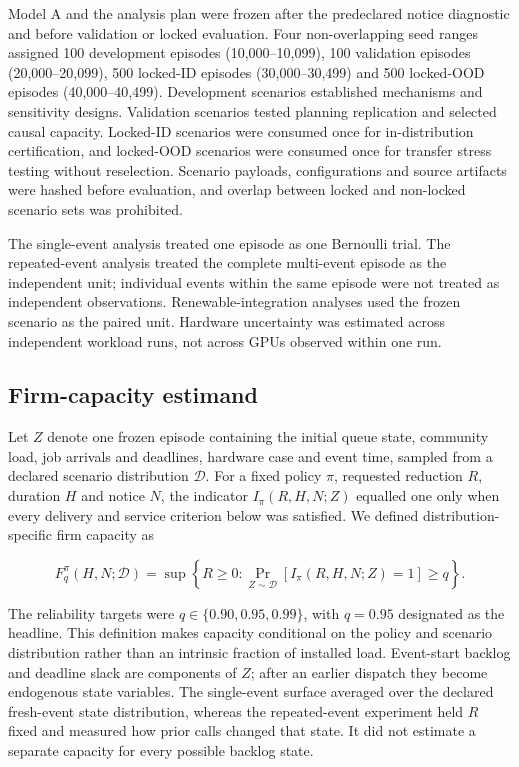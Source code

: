 \documentclass[10pt,a4paper]{article}
\begin{document}
Model A and the analysis plan were frozen after the predeclared notice diagnostic and before validation or locked evaluation. Four non-overlapping seed ranges assigned 100 development episodes (10,000–10,099), 100 validation episodes (20,000–20,099), 500 locked-ID episodes (30,000–30,499) and 500 locked-OOD episodes (40,000–40,499). Development scenarios established mechanisms and sensitivity designs. Validation scenarios tested planning replication and selected causal capacity. Locked-ID scenarios were consumed once for in-distribution certification, and locked-OOD scenarios were consumed once for transfer stress testing without reselection. Scenario payloads, configurations and source artifacts were hashed before evaluation, and overlap between locked and non-locked scenario sets was prohibited.


The single-event analysis treated one episode as one Bernoulli trial. The repeated-event analysis treated the complete multi-event episode as the independent unit; individual events within the same episode were not treated as independent observations. Renewable-integration analyses used the frozen scenario as the paired unit. Hardware uncertainty was estimated across independent workload runs, not across GPUs observed within one run.


\subsection*{Firm-capacity estimand}

Let \(Z\) denote one frozen episode containing the initial queue state, community load, job arrivals and deadlines, hardware case and event time, sampled from a declared scenario distribution \(\mathcal D\). For a fixed policy \(\pi\), requested reduction \(R\), duration \(H\) and notice \(N\), the indicator \(I_\pi(R,H,N;Z)\) equalled one only when every delivery and service criterion below was satisfied. We defined distribution-specific firm capacity as


\begin{equation*}
F_q^{\pi}(H,N;\mathcal D)=
\sup\left\{R\geq0:\Pr_{Z\sim\mathcal D}
\left[I_\pi(R,H,N;Z)=1\right]\geq q\right\}.
\end{equation*}

The reliability targets were \(q\in\{0.90,0.95,0.99\}\), with \(q=0.95\) designated as the headline. This definition makes capacity conditional on the policy and scenario distribution rather than an intrinsic fraction of installed load. Event-start backlog and deadline slack are components of \(Z\); after an earlier dispatch they become endogenous state variables. The single-event surface averaged over the declared fresh-event state distribution, whereas the repeated-event experiment held \(R\) fixed and measured how prior calls changed that state. It did not estimate a separate capacity for every possible backlog state.
\end{document}
